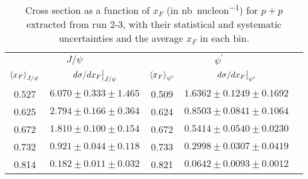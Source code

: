 \documentclass[../main.tex]{subfiles}
\begin{document}
\begin{table}[h!]
	\centering
	\caption{Cross section as a function of $x_F$ (in \unit{\nano\barn\per nucleon}) for $p+p$ extracted from run 2-3, with their statistical and systematic uncertainties and the average $x_F$ in each bin.}
	\begin{tabular}{cc|ccc}
		\hline
		\multicolumn{2}{c|}{$J/\psi$} & \multicolumn{2}{c}{$\psi^{\prime}$} &                                                                      \\ \cline{1-4}
		$\expval{x_F}_{J/\psi}$       & $\eval{d\sigma/dx_F}_{J/\psi}$      & $\expval{x_F}_{\psi^\prime}$ & $\eval{d\sigma/dx_F}_{\psi^\prime}$ & \\ \cline{1-4}
		\multicolumn{1}{c|}{0.527}    & $6.070\pm0.333\pm1.465$             & \multicolumn{1}{c|}{0.509}   & $1.6362\pm0.1249\pm0.1692$          & \\
		\multicolumn{1}{c|}{0.625}    & $2.794\pm0.166\pm0.364$             & \multicolumn{1}{c|}{0.624}   & $0.8503\pm0.0841\pm0.1064$          & \\
		\multicolumn{1}{c|}{0.672}    & $1.810\pm0.100\pm0.154$             & \multicolumn{1}{c|}{0.672}   & $0.5414\pm0.0540\pm0.0230$          & \\
		\multicolumn{1}{c|}{0.732}    & $0.921\pm0.044\pm0.118$             & \multicolumn{1}{c|}{0.733}   & $0.2998\pm0.0307\pm0.0419$          & \\
		\multicolumn{1}{c|}{0.814}    & $0.182\pm0.011\pm0.032$             & \multicolumn{1}{c|}{0.821}   & $0.0642\pm0.0093\pm0.0012$          & \\ \cline{1-4}
	\end{tabular}
\end{table}
\end{document}
